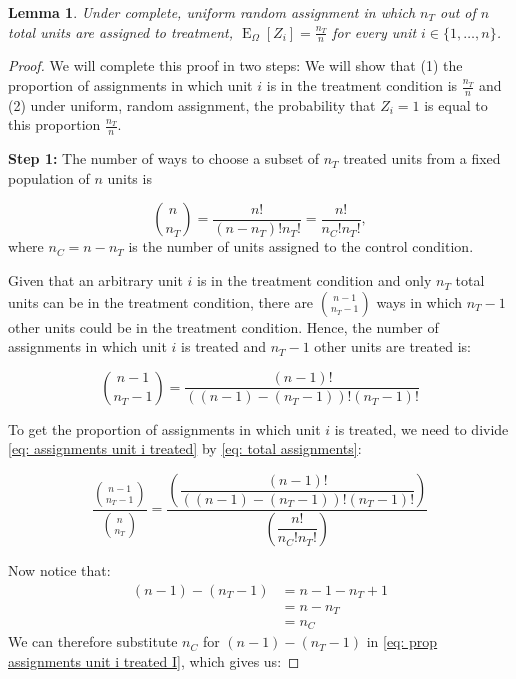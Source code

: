 \documentclass[12pt,leqno]{article}
\theoremstyle{newstyle}
\newtheorem{lem}{Lemma}
\DeclareMathOperator{\E}{\mathrm{E}}
\DeclareMathOperator{\Var}{\mathrm{Var}}
\newcommand{\EZ}{\E_{\Omega}}    \newcommand{\VarZ}{\Var_{\Omega}}  %
\begin{document}
\begin{lem} \label{lem: exp val Z}
Under complete, uniform random assignment in which $n_T$ out of $n$ total units are assigned to treatment, $\EZ[Z_i] = \frac{n_T}{n}$ for every unit $i \in \{1, \dots , n\}$.
\end{lem}
\begin{proof}

We will complete this proof in two steps: We will show that (1) the proportion of assignments in which unit $i$ is in the treatment condition is $\frac{n_T}{n}$ and (2) under uniform, random assignment, the probability that $Z_i = 1$ is equal to this proportion $\frac{n_T}{n}$.

\textbf{Step 1:} The number of ways to choose a subset of $n_T$ treated units from a fixed population of $n$ units is

\begin{equation} \label{eq: total assignments}
\binom{n}{n_T} = \dfrac{n!}{\left(n - n_T\right)!n_T!} = \dfrac{n!}{n_C!n_T!},
\end{equation}
where $n_C = n - n_T$ is the number of units assigned to the control condition.

Given that an arbitrary unit $i$ is in the treatment condition and only $n_T$ total units can be in the treatment condition, there are $\binom{n - 1}{n_T - 1}$ ways in which $n_T - 1$ other units could be in the treatment condition. Hence, the number of assignments in which unit $i$ is treated and $n_T - 1$ other units are treated is:

\begin{equation} \label{eq: assignments unit i treated}
\binom{n - 1}{n_T - 1} = \dfrac{\left(n - 1\right)!}{\left(\left(n - 1\right) - \left(n_T - 1\right)\right)!\left(n_T - 1\right)!}
\end{equation}

To get the proportion of assignments in which unit $i$ is treated, we need to divide \eqref{eq: assignments unit i treated} by \eqref{eq: total assignments}:

\begin{equation} \label{eq: prop assignments unit i treated I}
\dfrac{\binom{n - 1}{n_T - 1}}{\binom{n}{n_T}} = \dfrac{\left(\dfrac{\left(n - 1\right)!}{\left(\left(n - 1\right) - \left(n_T - 1\right)\right)!\left(n_T - 1\right)!}\right)}{\left(\dfrac{n!}{n_C!n_T!}\right)}
\end{equation}

Now notice that:
\begin{align*}
\left(n - 1\right) - \left(n_T - 1\right) & = n - 1 - n_T + 1 \\
& = n - n_T \\
& = n_C
\end{align*}
We can therefore substitute $n_C$ for $(n - 1) - (n_T - 1)$ in \eqref{eq: prop assignments unit i treated I}, which gives us:


\end{proof}
\end{document}
